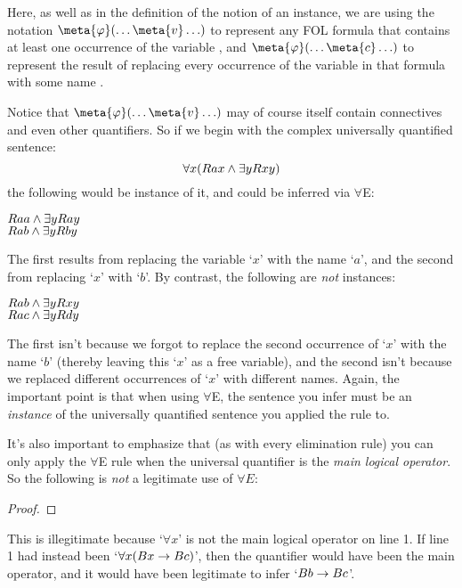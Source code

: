 Here, as well as in the definition of the notion of an instance, we are using the notation $\meta{\varphi}(\ldots \meta{v} \ldots)$ to represent any FOL formula \meta{\varphi} that contains at least one occurrence of the variable , and $\meta{\varphi}(\ldots \meta{c} \ldots)$ to represent the result of replacing every occurrence of the variable  in that formula with some name .

Notice that $\meta{\varphi}(\ldots \meta{v} \ldots)$ may of course itself contain connectives and even other quantifiers.  So if we begin with the complex universally quantified sentence:
$$\forall x(Rax \wedge \exists yRxy)$$
the following would be instance of it, and could be inferred via $\forall$E:
\begin{center}
$Raa \wedge \exists yRay$\\
$Rab \wedge \exists yRby$
\end{center}
The first results from replacing the variable `$x$' with the name `$a$', and the second from replacing `$x$' with `$b$'. By contrast, the following are \emph{not} instances:
\begin{center}
$Rab \wedge \exists yRxy$\\
$Rac \wedge \exists yRdy$
\end{center}
The first isn't because we forgot to replace the second occurrence of `$x$' with the name `$b$' (thereby leaving this `$x$' as a free variable), and the second isn't because we replaced different occurrences of `$x$' with different names.  Again, the important point is that when using $\forall$E, the sentence you infer must be an \emph{instance} of the universally quantified sentence you applied the rule to.



It's also important to emphasize that (as with every elimination rule) you can only apply the $\forall$E rule when the universal quantifier is the \emph{main logical operator}. So the following is \emph{not} a legitimate use of $\forall E$:
\begin{proof}
\end{proof}
This is illegitimate because `$\forall x$' is not the main logical operator on line 1. If line 1 had instead been `$\forall x(Bx \rightarrow Bc)$', then the quantifier would have been the main operator, and it would have been legitimate to infer `$Bb \rightarrow Bc$'.

